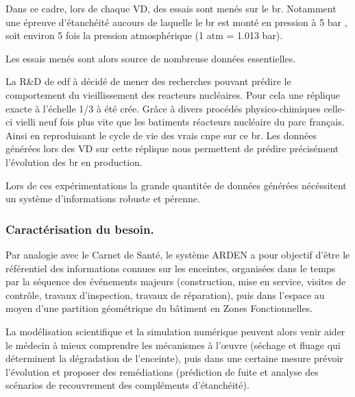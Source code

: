 Dans ce cadre, lors de chaque \gls{VD}, des essais sont menés sur le \acrshort{br}. Notamment une épreuve d'étanchéité aucours de laquelle le \gls{br} est monté en pression à 5 bar , soit environ 5 fois la pression atmosphérique (1 atm = 1.013 bar).

Les essais menés sont alors source de nombreuse données essentielles.

La R\&D de \gls{edf} à décidé de mener des recherches pouvant prédire le comportement du vieillissement des reacteurs nucléaires. Pour cela une réplique exacte à l'échelle 1/3 à été crée. Grâce à divers procédés physico-chimiques celle-ci vielli neuf fois plus vite que les batiments réacteurs nucléaire du parc français. Ainsi en reproduisant le cycle de vie des vrais \gls{cnpe} sur ce \gls{br}. Les données générées lors des \gls{VD} sur cette réplique nous permettent de prédire précisément l'évolution des \gls{br} en production.

Lors de ces expérimentations la grande quantitée de données générées nécéssitent un système d'informations robuste et pérenne.
\subsubsection{Caractérisation du besoin.}

Par analogie avec le Carnet de Santé, le système ARDEN a pour objectif d’être le référentiel des informations connues sur les enceintes, organisées dans le temps par la séquence des événements majeurs (construction, mise en service, visites de contrôle, travaux d’inspection, travaux de réparation), puis dans l’espace au moyen d’une partition géométrique du bâtiment en Zones Fonctionnelles.

La modélisation scientifique et la simulation numérique peuvent alors venir aider le médecin à mieux comprendre les mécanismes à l’œuvre (séchage et fluage qui déterminent la dégradation de l’enceinte), puis dans une certaine mesure prévoir l’évolution et proposer des remédiations (prédiction de fuite et analyse des scénarios de recouvrement des compléments d’étanchéité).


